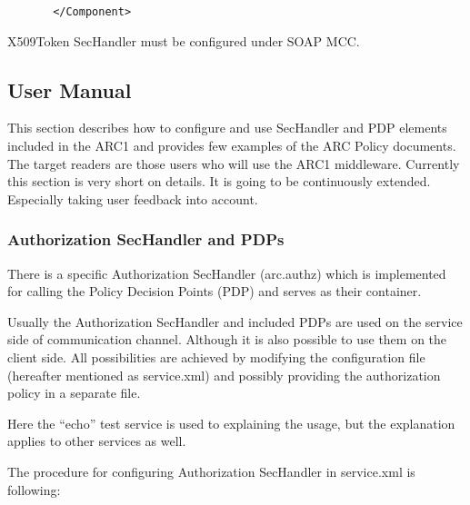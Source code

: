 \documentclass{article}
\begin{document}
{\upshape\color{black}
\texttt{\ \ \ \ \ \ \ {\textless}/Component{\textgreater}}}

{\color{black}
X509Token SecHandler must be configured under SOAP MCC.}


\bigskip

\subsection{User Manual}
{\color{black}
This section describes how to configure and use SecHandler and PDP
elements included in the ARC1 and provides few examples of the ARC
Policy documents. The target readers are those users who will use the
ARC1 middleware. Currently this section is very short on details. It is
going to be continuously extended. Especially taking user feedback into
account.}

\subsubsection[Authorization SecHandler and PDPs]{Authorization
SecHandler and PDPs}
{\color{black}
There is a specific Authorization SecHandler (arc.authz) which is
implemented for calling the Policy Decision Points (PDP) and serves as
their container. }

{\color{black}
Usually the Authorization SecHandler and included PDPs are used on the
service side of communication channel. Although it is also possible to
use them on the client side. All possibilities are achieved by
modifying the configuration file (hereafter mentioned as service.xml)
and possibly providing the authorization policy in a separate file.}

{\color{black}
Here the {\textquotedblleft}echo{\textquotedblright} test service is
used to explaining the usage, but the explanation applies to other
services as well.}

{\color{black}
The procedure for configuring Authorization SecHandler in service.xml is
following:}
\end{document}
